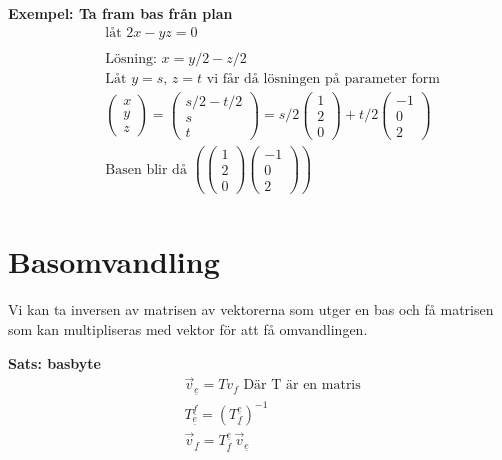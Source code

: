 \textbf{Exempel: Ta fram bas från plan}
\begin{align*}
  &\quad  \text{låt } 2x -y z = 0 \\
  &\quad  \\
  &\quad  \text{Lösning: }  x=y/2 -z/2 \\
  &\quad  \text{Låt } y=s, \, z=t \text{ vi får då lösningen på parameter form} \\
  &\quad  \begin{pmatrix} x \\ y \\ z \end{pmatrix} =
  \begin{pmatrix} s/2 -t/2 \\ s \\ t \end{pmatrix} =
  s/2\begin{pmatrix} 1 \\ 2 \\ 0 \end{pmatrix} +
  t/2\begin{pmatrix} -1 \\ 0 \\ 2 \end{pmatrix} \\
  &\quad  \text{Basen blir då }
  \left( \begin{pmatrix} 1 \\ 2 \\ 0 \end{pmatrix} \begin{pmatrix} -1 \\ 0 \\ 2 \end{pmatrix} \right) \\
\end{align*}


\newpage

\section{Basomvandling}
Vi kan ta inversen av matrisen av vektorerna som utger en bas och få
matrisen som kan multipliseras med vektor för att få omvandlingen.

\textbf{Sats: basbyte}
\begin{align*}
  &\quad  \vec{v}_{\underline{e}} = Tv_{f} \text{ Där T är en matris} \\
  &\quad  T^{\underline{f}}_{\underline{e}} = {(T^{\underline{e}}_{\underline{f}})}^{-1} \\
  &\quad  \vec{v}_{\underline{f}} = T^{\underline{e}}_{\underline{f}} \, \vec{v}_{\underline{e}} \\
\end{align*}

